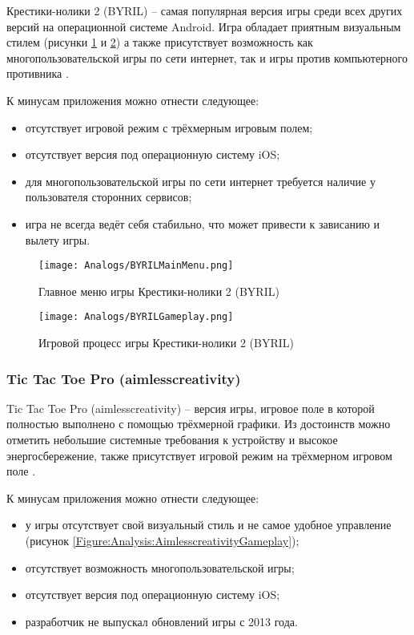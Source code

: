 Крестики-нолики 2 (BYRIL) -- самая популярная версия игры среди всех других версий на операционной системе Android. Игра обладает приятным визуальным стилем (рисунки \ref{Figure:Analysis:BYRILMainMenu} и \ref{Figure:Analysis:BYRILGameplay}) а также присутствует возможность как многопользовательской игры по сети интернет, так и игры против компьютерного противника \cite{BYRIL}.

К минусам приложения можно отнести следующее:
\begin{itemize}
    \item отсутствует игровой режим с трёхмерным игровым полем;
    \item отсутствует версия под операционную систему iOS;
    \item для многопользовательской игры по сети интернет требуется наличие у пользователя сторонних сервисов;
    \item игра не всегда ведёт себя стабильно, что может привести к зависанию и вылету игры.
\end{itemize}

\begin{figure}
    \centering
    \texttt{[image: Analogs/BYRILMainMenu.png]}
    \caption{Главное меню игры Крестики-нолики 2 (BYRIL)}
    \label{Figure:Analysis:BYRILMainMenu}
\end{figure}

\begin{figure}
    \centering
    \texttt{[image: Analogs/BYRILGameplay.png]}
    \caption{Игровой процесс игры Крестики-нолики 2 (BYRIL)}
    \label{Figure:Analysis:BYRILGameplay}
\end{figure}


\subsubsection{Tic Tac Toe Pro (aimlesscreativity)}

Tic Tac Toe Pro (aimlesscreativity) -- версия игры, игровое поле в которой полностью выполнено с помощью трёхмерной графики. Из достоинств можно отметить небольшие системные требования к устройству и высокое энергосбережение, также присутствует игровой режим на трёхмерном игровом поле \cite{Aimlesscreativity}.

К минусам приложения можно отнести следующее:
\begin{itemize}
    \item у игры отсутствует свой визуальный стиль и не самое удобное управление (рисунок \ref{Figure:Analysis:AimlesscreativityGameplay});
    \item отсутствует возможность многопользовательской игры;
    \item отсутствует версия под операционную систему iOS;
    \item разработчик не выпускал обновлений игры с 2013 года.
\end{itemize}

